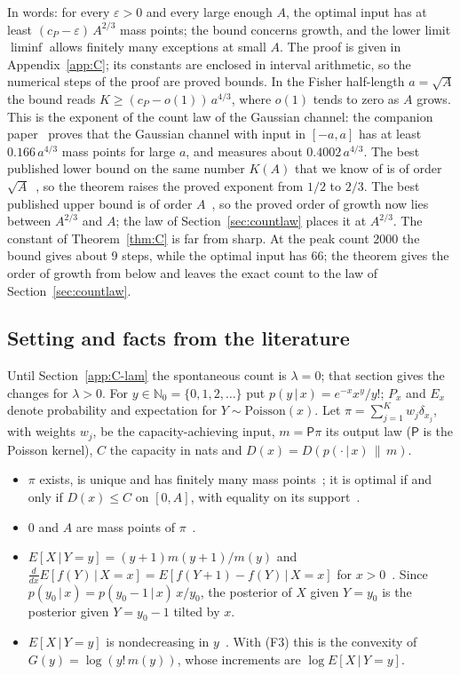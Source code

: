 In words: for every $\varepsilon>0$ and every large enough $A$, the optimal input has at least $(c_P-\varepsilon)\,A^{2/3}$ mass
points; the bound concerns growth, and the lower limit $\liminf$ allows finitely many exceptions at small $A$. The proof is given
in Appendix~\ref{app:C}; its constants are enclosed in interval arithmetic, so the numerical steps of the proof are proved bounds. In the Fisher half-length $a=\sqrt A$ the bound reads $K\ge(c_P-o(1))\,a^{4/3}$, where $o(1)$ tends to zero as $A$ grows. This is the exponent of the count
law of the Gaussian channel: the companion paper~\cite{Paper1} proves that the Gaussian channel with input in $[-a,a]$ has at least
$0.166\,a^{4/3}$ mass points for large $a$, and measures about $0.4002\,a^{4/3}$. The best published lower bound on the same number $K(A)$
that we know of is of order $\sqrt A$~\cite{DBS2021,BDS2024}, so the theorem raises the proved exponent from $1/2$ to $2/3$. The
best published upper bound is of order $A$~\cite{BDS2024}, so the proved order of growth now lies between $A^{2/3}$ and $A$; the law
of Section~\ref{sec:countlaw} places it at $A^{2/3}$. The constant of Theorem~\ref{thm:C} is far from sharp. At the peak count
$2000$ the bound gives about 9 steps, while the optimal input has 66; the theorem gives the order of growth from below and leaves the
exact count to the law of Section~\ref{sec:countlaw}.

\subsection{Setting and facts from the literature}

Until Section~\ref{app:C-lam} the spontaneous count is $\lambda=0$; that section gives the changes for $\lambda>0$.
For $y\in\mathbb N_0=\{0,1,2,\dots\}$ put $p(y\,|\,x)=e^{-x}x^y/y!$; $P_x$ and $E_x$ denote probability and expectation for $Y\sim\mathrm{Poisson}(x)$. Let $\pi=\sum_{j=1}^{K}w_j\delta_{x_j}$, with weights $w_j$, be the capacity-achieving input, $m=\mathsf P\pi$ its
output law ($\mathsf P$ is the Poisson kernel), $C$ the capacity in nats and $D(x)=D(p(\cdot\,|\,x)\,\|\,m)$.
\begin{itemize}
\item[(F1)] $\pi$ exists, is unique and has finitely many mass points~\cite{Shamai1990}; it is optimal if and only if $D(x)\le C$ on
$[0,A]$, with equality on its support~\cite[Lemma~1]{BDS2024}.
\item[(F2)] $0$ and $A$ are mass points of $\pi$~\cite[Corollaries~2 and~4]{Cao2014}.
\item[(F3)] $E[X\,|\,Y=y]=(y+1)m(y+1)/m(y)$ and $\frac{d}{dx}E[f(Y)\,|\,X=x]=E[f(Y+1)-f(Y)\,|\,X=x]$ for $x>0$~\cite[Appendix~D]{BDS2024}.
Since $p(y_0\,|\,x)=p(y_0-1\,|\,x)\,x/y_0$, the posterior of $X$ given $Y=y_0$ is the posterior given $Y=y_0-1$ tilted by $x$.
\item[(F4)] $E[X\,|\,Y=y]$ is nondecreasing in $y$~\cite[Lemma~3]{BDS2024}. With (F3) this is the convexity of
$G(y)=\log(y!\,m(y))$, whose increments are $\log E[X\,|\,Y=y]$.
\end{itemize}

